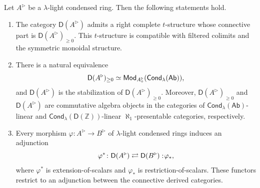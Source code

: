 \begin{lemma}\label{t-structures on derived categories}
Let $A^\triangleright$ be a $\lambda$-light condensed ring. Then the following statements hold.
\begin{enumerate}
    \item The category $\mathsf{D}(A^\triangleright)$ admits a right complete $t$\nobreakdash-structure whose connective part is $\mathsf{D}(A^\triangleright)_{\geq0}$. This $t$\nobreakdash-structure is compatible with filtered colimits and the symmetric monoidal structure.
    \item There is a natural equivalence
    \[\mathsf{D}(A^\triangleright)_{\geq0}\simeq\mathsf{Mod}_{A^\triangleright_\circ}\mleft(\mathsf{Cond}_\lambda(\mathsf{Ab})\mright),\]
    and $\mathsf{D}(A^\triangleright)$ is the stabilization of $\mathsf{D}(A^\triangleright)_{\geq0}$. Moreover, $\mathsf{D}(A^\triangleright)_{\geq0}$ and $\mathsf{D}(A^\triangleright)$ are commutative algebra objects in the categories of $\mathsf{Cond}_\lambda(\mathsf{Ab})$-linear and $\mathsf{Cond}_\lambda(\mathsf{D}(\mathbb{Z}))$-linear $\aleph_1$-presentable categories, respectively.
    \item Every morphism $\varphi\colon A^\triangleright\to B^\triangleright$ of $\lambda$-light condensed rings induces an adjunction
    \[\varphi^*\colon\mathsf{D}(A^\triangleright)\rightleftarrows\mathsf{D}(B^\triangleright):\hspace{-0.2em}\varphi_*,\]
    where $\varphi^*$ is extension-of-scalars and $\varphi_*$ is restriction-of-scalars. These functors restrict to an adjunction between the connective derived categories.
\end{enumerate}
\end{lemma}

